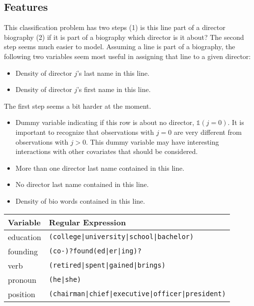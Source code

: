 \documentclass{article}
\newcommand{\1}{\mathds{1}}
\begin{document}
\subsection{Features}


This classification problem has two steps (1) is this line part of a
director biography (2) if it is part of a biography which director is
it about? The second step seems much easier to model. Assuming a line
is part of a biography, the following two variables seem most useful
in assigning that line to a given director:

\begin{itemize}
\item Density of director $j$'s last name in this line.
\item Density of director $j$'s first name in this line.
\end{itemize}

The first step seems a bit harder at the moment.

\begin{itemize}
\item Dummy variable indicating if this row is about no director,
  $\1(j=0)$. It is important to recognize that observations with $j=0$
  are very different from observations with $j>0$. This dummy variable
  may have interesting interactions with other covariates that should
  be considered.
\item More than one director last name contained in this line.
\item No director last name contained in this line.
\item Density of bio words contained in this line.
\end{itemize}

\begin{table}[h]
\centering
\begin{tabular}{ll}
Variable & Regular Expression \\
\hline
education & \texttt{(college|university|school|bachelor)} \\
founding & \texttt{(co-)?found(ed|er|ing)?} \\
verb & \texttt{(retired|spent|gained|brings)} \\
pronoun & \texttt{(he|she)} \\
position & \texttt{(chairman|chief|executive|officer|president)} \\
\end{tabular}
\end{table}
\end{document}
